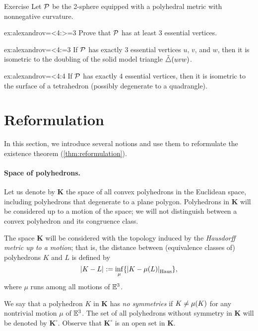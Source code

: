 \begin{thm}[!]{Exercise}\label{ex:alexandrov=<4}
Let $\mathcal{P}$ be the 2-sphere equipped with a polyhedral metric with nonnegative curvature.

\begin{subthm}{ex:alexandrov=<4:>=3}
Prove that $\mathcal{P}$ has at least 3 essential vertices.
\end{subthm}

\begin{subthm}{ex:alexandrov=<4:=3}
If $\mathcal{P}$ has exactly 3 essential vertices $u$, $v$, and $w$, then it is isometric to the doubling of the solid model triangle $\tilde\triangle(uvw)$.
\end{subthm}

\begin{subthm}{ex:alexandrov=<4:4}
If $\mathcal{P}$ has exactly 4 essential vertices, then it is isometric to the surface of a tetrahedron (possibly degenerate to a quadrangle).
\end{subthm}

\end{thm}

\section{Reformulation}

In this section, we introduce several notions and use them to reformulate the existence theorem (\ref{thm:reformulation}).

\paragraph{Space of polyhedrons.}
Let us denote by $\bm{K}$ the space of all convex polyhedrons in the Euclidean space,
including polyhedrons that degenerate to a plane polygon.
Polyhedrons in $\bm{K}$ will be considered up to a motion of the space; we will not distinguish between a convex polyhedron and its congruence class.

The space $\bm{K}$ will be considered with the topology induced by the {}\emph{Hausdorff metric up to a motion};
that is, the distance between (equivalence classes of) polyhedrons $K$ and $L$ is defined by
\[|{K}-{L}|_{}^{{}}\mathrel{:=} \inf_\mu \{|{K}-{\mu(L)}|_{\operatorname{\rm Haus}\nolimits}^{{}}\},\]
where $\mu$ runs among all motions of $\mathbb{E}^3$.

We say that a polyhedron $K$ in $\bm{K}$ has \emph{no symmetries} if  $K\ne \mu(K)$ for any nontrivial motion $\mu$ of $\mathbb{E}^3$.
The set of all polyhedrons without symmetry in $\bm{K}$ will be denoted by $\bm{K}^\circ$.
Observe that $\bm{K}^\circ$ is an open set in $\bm{K}$.

